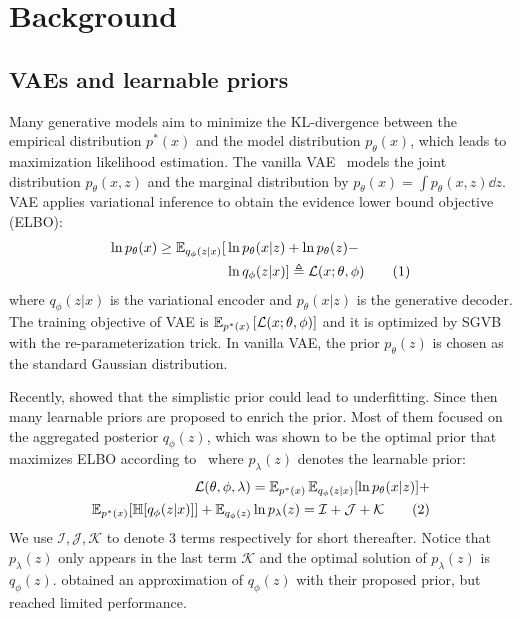 \section{Background}

\subsection{VAEs and learnable priors}

Many generative models aim to minimize the KL-divergence between the empirical distribution $p^*(x)$ and the model distribution $p_\theta(x)$, which leads to maximization likelihood estimation. The vanilla VAE~\cite{kingma2014auto} models the joint distribution $p_\theta(x, z)$ and the marginal distribution by $p_\theta(x) = \int p_\theta(x, z) \dd z$. VAE applies variational inference to obtain the evidence lower bound objective (ELBO): 
\begin{align*} \label{eq:ELBO}
\ln p_\theta(x) \geq \operatorname{\mathbb{E}}_{q_\phi(z|x)} [  &  \ln p_\theta(x|z) + \ln p_\theta(z) - \\ & \ln q_\phi(z|x) ] 
\triangleq \mathcal{L}(x; \theta, \phi) \tag{1}
\end{align*}
where $q_\phi(z|x)$ is the variational encoder and $p_\theta(x|z)$ is the generative decoder. The training objective of VAE is $\operatorname{\mathbb{E}}_{{p^*(x)}}\left[{\mathcal{L}(x; \theta, \phi)}\right]$ and it is optimized by SGVB with the re-parameterization trick. In vanilla VAE, the prior $p_\theta(z)$ is chosen as the standard Gaussian distribution. 

Recently, \cite{tomczak2018vae} showed that the simplistic prior could lead to underfitting. Since then many learnable priors are proposed to enrich the prior. Most of them focused on the aggregated posterior $q_\phi(z)$, which was shown to be the optimal prior that maximizes ELBO according to~\cite{tomczak2018vae} where $p_\lambda(z)$ denotes the learnable prior:
\begin{align*} \label{eq:second-decomposition}
\mathcal{L}(\theta, \phi, \lambda) = \operatorname{\mathbb{E}}_{p^*(x)}\operatorname{\mathbb{E}}_{q_\phi(z|x)} [ \ln p_\theta(x|z)] + \\ 
\operatorname{\mathbb{E}}_{p^*(x)}[\mathbb{H}[q_\phi(z|x)]] + \operatorname{\mathbb{E}}_{q_\phi(z)} \ln p_\lambda(z) = \mathcal{I} + \mathcal{J} + \mathcal{K} \tag{2}
\end{align*}
We use $\mathcal{I}, \mathcal{J}, \mathcal{K}$ to denote 3 terms respectively for short thereafter. 
Notice that $p_\lambda(z)$ only appears in the last term $\mathcal{K}$ and the optimal solution of $p_\lambda(z)$ is $q_\phi(z)$. \cite{tomczak2018vae,takahashi2019variational} obtained an approximation of $q_\phi(z)$ with their proposed prior, but reached limited performance. 

